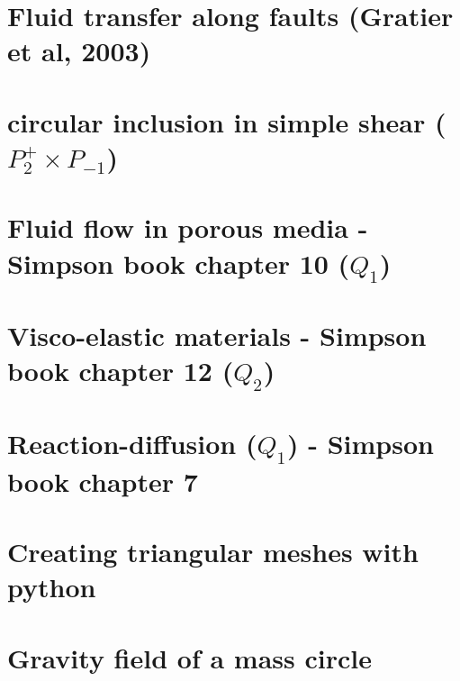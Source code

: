 \documentclass[a4paper,11pt]{report}
\begin{document}
\chapter{Fluid transfer along faults (Gratier et al, 2003)\label{f126}} %

\chapter{circular inclusion in simple shear ($P_2^+\times P_{-1}$)\label{f127}} %

\chapter{Fluid flow in porous media - Simpson book chapter 10 ($Q_1$)\label{f128}} %

\chapter{Visco-elastic materials - Simpson book chapter 12 ($Q_2$)\label{f129}} %

\chapter{Reaction-diffusion ($Q_1$) - Simpson book chapter 7\label{f130}} %

\chapter{Creating triangular meshes with python \label{f131}} %

\chapter{Gravity field of a mass circle\label{f132}} %
\end{document}
